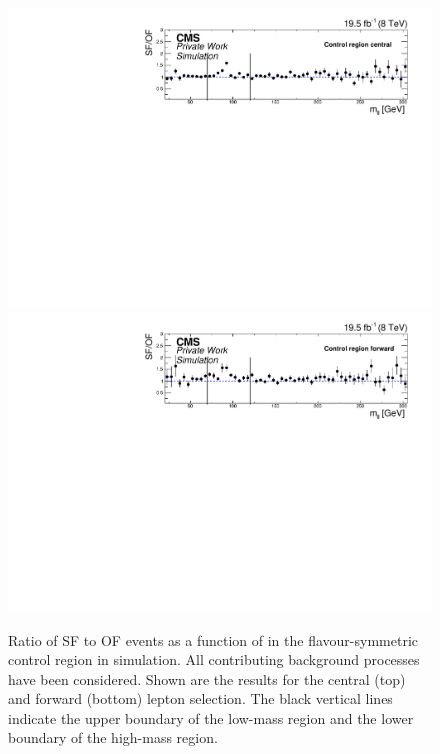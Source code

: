 \begin{figure}
\begin{center}
\includegraphics[scale=0.5]{plots/BG/control/rSFOF_ControlCentral_Full2012_Mll_None_MC.pdf}\\
\includegraphics[scale=0.5]{plots/BG/control/rSFOF_ControlForward_Full2012_Mll_None_MC.pdf}
\caption{Ratio of SF to OF events as a function of \mll in the flavour-symmetric control region in simulation. All contributing background processes have been considered. Shown are the results for the central (top) and forward (bottom) lepton selection. The black vertical lines indicate the upper boundary of the low-mass region and the lower boundary of the high-mass region.}
\label{fig:controlRatioMC}
\end{center}
\end{figure}

